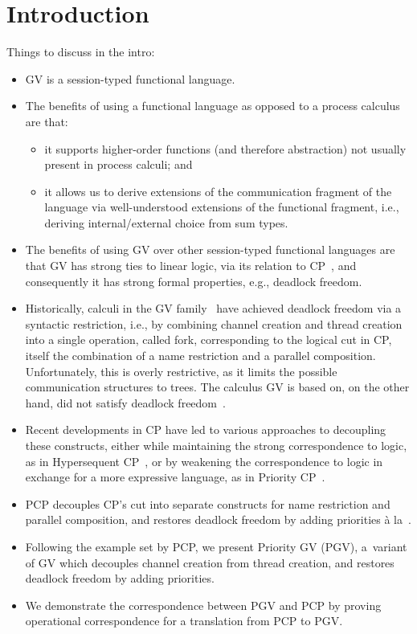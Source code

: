 \documentclass[main.tex]{subfiles}
\begin{document}
\section{Introduction}

Things to discuss in the intro:

\begin{itemize}
\item GV is a session-typed functional language.
\item
  The benefits of using a functional language as opposed to a process calculus are that:
  \begin{itemize}
  \item 
    it supports higher-order functions (and therefore abstraction) not usually present in process calculi; and
  \item
    it allows us to derive extensions of the communication fragment of the language via well-understood extensions of the functional fragment, i.e., deriving internal/external choice from sum types.
  \end{itemize}
\item
  The benefits of using GV over other session-typed functional languages are that GV has strong ties to linear logic, via its relation to CP~\cite{wadler12}, and consequently it has strong formal properties, e.g., deadlock freedom.
\item
  Historically, calculi in the GV family~\cite{wadler12,lindleymorris15} have achieved deadlock freedom via a syntactic restriction, i.e., by combining channel creation and thread creation into a single operation, called fork, corresponding to the logical cut in CP, itself the combination of a name restriction and a parallel composition.
  Unfortunately, this is overly restrictive, as it limits the possible communication structures to trees. The calculus GV is based on, on the other hand, did not satisfy deadlock freedom~\cite{gayvasconcelos10}.
\item
  Recent developments in CP have led to various approaches to decoupling these constructs, either while maintaining the strong correspondence to logic, as in Hypersequent CP~\cite[HCP]{kokkemontesi19popl,kokkemontesi19tlla}, or by weakening the correspondence to logic in exchange for a more expressive language, as in Priority CP~\cite[PCP]{dardhagay18}.
\item
  PCP decouples CP's cut into separate constructs for name restriction and parallel composition, and restores deadlock freedom by adding priorities \`{a} la~\cite{kobayashi06}.
\item
  Following the example set by PCP, we present Priority GV (PGV), a~variant of GV which decouples channel creation from thread creation, and restores deadlock freedom by adding priorities.
\item
  We demonstrate the correspondence between PGV and PCP by proving operational correspondence for a translation from PCP to PGV.
\end{itemize}
\end{document}
